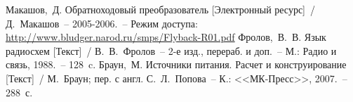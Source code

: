 \newpage
{}
\begin{thebibliography}{9}
	 Макашов,~Д. Обратноходовый преобразователь [Электронный ресурс]~/
	Д.~Макашов~-- 2005-2006.~-- Режим доступа:
	\href{http://www.bludger.narod.ru/smps/Flyback-R01.pdf}
	{http://www.bludger.narod.ru/smps/Flyback-R01.pdf}
	 Фролов,~В.~В. Язык радиосхем [Текст]~/ В.~В.~Фролов~-- 2-е изд., перераб.
	и доп.~-- М.: Радио и связь, 1988.~-- 128~c.
	 Браун,~М. Источники питания. Расчет и конструирование [Текст]~/
	М.~Браун; пер. с англ. С.~Л.~Попова~-- К.: <<МК-Пресс>>, 2007.~-- 288~с.
\end{thebibliography}

